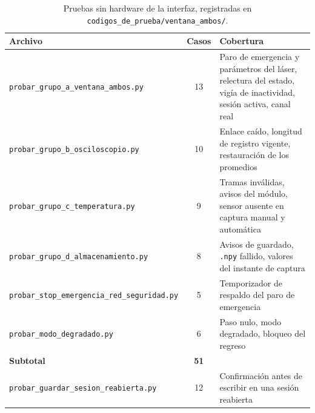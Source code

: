 \begin{table}[H]
  \centering
  \caption[Pruebas sin hardware de la interfaz]{Pruebas sin hardware
           de la interfaz, registradas en
           \texttt{codigos\_de\_prueba/\allowbreak ventana\_ambos/}.}
  \label{tab:pruebas_interfaz}
  \small
  \begin{tabularx}{\textwidth}{>{\raggedright\arraybackslash}p{4.6cm}
                               c >{\raggedright\arraybackslash}X}
    \toprule
    \textbf{Archivo} & \textbf{Casos} & \textbf{Cobertura} \\
    \midrule
    \texttt{probar\_\allowbreak{}grupo\_\allowbreak{}a\_\allowbreak{}ventana\_\allowbreak{}ambos.py} & 13 &
      Paro de emergencia y parámetros del láser, relectura del estado,
      vigía de inactividad, sesión activa, canal real \\
    \texttt{probar\_\allowbreak{}grupo\_\allowbreak{}b\_\allowbreak{}osciloscopio.py} & 10 &
      Enlace caído, longitud de registro vigente, restauración de los
      promedios \\
    \texttt{probar\_\allowbreak{}grupo\_\allowbreak{}c\_\allowbreak{}temperatura.py} & 9 &
      Tramas inválidas, avisos del módulo, sensor ausente en captura
      manual y automática \\
    \texttt{probar\_\allowbreak{}grupo\_\allowbreak{}d\_\allowbreak{}almacenamiento.py} & 8 &
      Avisos de guardado, \texttt{.npy} fallido, valores del instante
      de captura \\
    \texttt{probar\_\allowbreak{}stop\_\allowbreak{}emergencia\_\allowbreak{}red\_\allowbreak{}seguridad.py} & 5 &
      Temporizador de respaldo del paro de emergencia \\
    \texttt{probar\_\allowbreak{}modo\_\allowbreak{}degradado.py} & 6 &
      Paso nulo, modo degradado, bloqueo del regreso \\
    \midrule
    \textbf{Subtotal} & \textbf{51} & \\
    \midrule
    \texttt{probar\_\allowbreak{}guardar\_\allowbreak{}sesion\_\allowbreak{}reabierta.py} & 12 &
      Confirmación antes de escribir en una sesión reabierta \\
    \bottomrule
  \end{tabularx}
\end{table}

